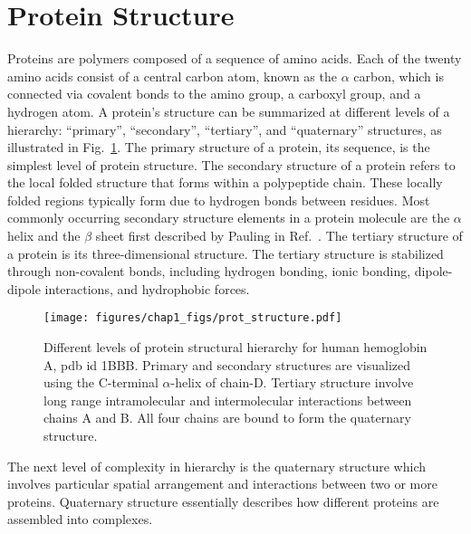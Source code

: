 \documentclass[../talant.diss.submit.tex]{subfiles}
\begin{document}


\section{\textbf{Protein Structure}}\label{sect:one_two}

Proteins are polymers composed of a sequence of amino acids.  Each of
the twenty amino acids consist of a central carbon atom, known as the $\alpha$
carbon, which is connected via covalent bonds to the amino group, a carboxyl
group, and a hydrogen atom.  A protein's structure can be summarized at
different levels of a hierarchy: ``primary'', ``secondary'', ``tertiary'', and
``quaternary'' structures, as illustrated in Fig.~\ref{fig:prot_struct}.  The
primary structure of a protein, its sequence, is the simplest level of protein
structure. The secondary structure of a protein refers to the local folded
structure that forms within a polypeptide chain.  These locally folded regions typically
form due to hydrogen bonds between residues.
Most commonly occurring secondary structure elements in a protein
molecule are the $\alpha$ helix and the $\beta$ sheet first described by Pauling in
Ref.~\cite{pauling:54s}.  The tertiary structure of a protein is its
three-dimensional structure.  The tertiary structure is stabilized through
non-covalent bonds, including hydrogen bonding, ionic bonding, dipole-dipole
interactions, and hydrophobic forces.
%
%
\begin{figure}[htp!]
  \begin{centering}
    \texttt{[image: figures/chap1\_figs/prot\_structure.pdf]}
    \caption{Different levels of protein structural hierarchy for human hemoglobin A,
      pdb id 1BBB. Primary and secondary structures are
      visualized using the C-terminal $\alpha$-helix of chain-D. Tertiary structure
      involve long range intramolecular and intermolecular interactions between
      chains A and B. All four chains are bound to form the quaternary structure.}
    \label{fig:prot_struct}
  \end{centering}
\end{figure}
%
%
The next level of complexity in hierarchy is the quaternary structure which involves 
particular spatial arrangement and interactions between two or more proteins.
Quaternary structure essentially describes how different proteins are assembled
into complexes.
\end{document}
